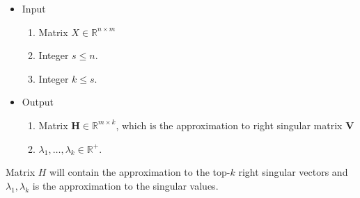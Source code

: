 \documentclass[letterpaper]{article}
\newcommand {\bV}{\mathbf{V}}
\newcommand {\bH}{\mathbf{H}}
\begin{document}
\begin{itemize} 
\item Input 
	\begin{enumerate} 
		\item Matrix $X \in \mathbb{R}^{n \times m}$
		\item Integer $s \leq n$.
		\item Integer $k \leq s$.
\end{enumerate}
\item Output
		\begin{enumerate} 
		\item Matrix $\bH \in \mathbb{R}^{m \times k}$, which is the approximation to right singular matrix $\bV$
		\item $\lambda_1, \ldots, \lambda_k \in \mathbb{R}^+$.
		\end{enumerate}
\end{itemize} 

Matrix $H$ will contain the approximation to the top-$k$ right singular
vectors and $\lambda_1, \lambda_k$ is the approximation to the singular 
values.
\end{document}
